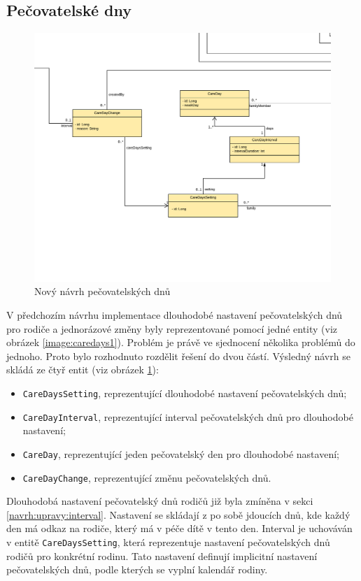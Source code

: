     \subsection{Pečovatelské dny}\label{navrh:upravy:caredays} %
        \begin{figure}\centering
	       \includegraphics[width=1.0\textwidth]{pdfs/CareDays2}
	       \caption[Nový návrh pečovatelských dnů]{Nový návrh pečovatelských dnů}\label{image:caredays2}
        \end{figure}
        V předchozím návrhu implementace dlouhodobé nastavení pečovatelských dnů pro rodiče a jednorázové změny byly reprezentované pomocí jedné entity (viz obrázek \ref{image:caredays1}). Problém je právě ve sjednocení několika problémů do jednoho. Proto bylo rozhodnuto rozdělit řešení do dvou částí. Výsledný návrh se skládá ze čtyř entit (viz obrázek \ref{image:caredays2}):
        \begin{itemize}
            \item \texttt{CareDaysSetting}, reprezentující dlouhodobé nastavení pečovatelských dnů;
            \item \texttt{CareDayInterval}, reprezentující interval pečovatelských dnů pro dlouhodobé nastavení;
            \item \texttt{CareDay}, reprezentující jeden pečovatelský den pro dlouhodobé nastavení;
            \item \texttt{CareDayChange}, reprezentující změnu pečovatelských dnů.
        \end{itemize}
        Dlouhodobá nastavení pečovatelský dnů rodičů již byla zmíněna v sekci \ref{navrh:upravy:interval}. Nastavení se skládají z po sobě jdoucích dnů, kde každý den má odkaz na rodiče, který má v péče dítě v tento den. Interval je uchováván v entitě \verb|CareDaysSetting|, která reprezentuje nastavení pečovatelských dnů rodičů pro konkrétní rodinu. Tato nastavení definují implicitní nastavení pečovatelských dnů, podle kterých se vyplní kalendář rodiny.
        
